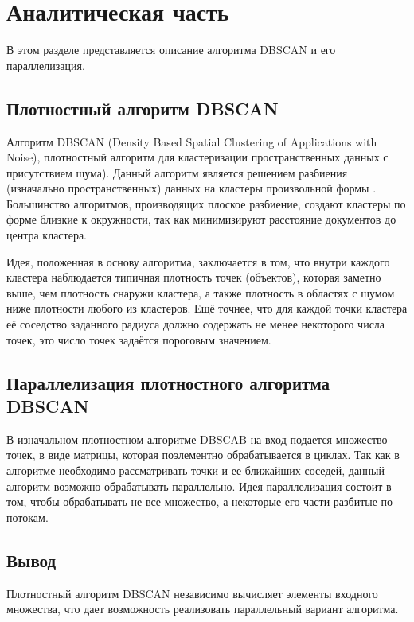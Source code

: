 \chapter{Аналитическая часть}

В этом разделе представляется описание алгоритма DBSCAN и его параллелизация.


\section{Плотностный алгоритм DBSCAN}

Алгоритм DBSCAN \cite{dbscan} (Density Based Spatial Clustering of Applications with Noise),
плотностный алгоритм для кластеризации пространственных данных с присутствием
шума). 
Данный алгоритм является решением разбиения (изначально пространственных) данных на кластеры произвольной формы \cite{cluster}.
Большинство алгоритмов, производящих плоское разбиение, создают кластеры по форме близкие к окружности, так как минимизируют расстояние документов до центра кластера. %

Идея, положенная в основу алгоритма, заключается в том, что внутри каждого кластера наблюдается типичная плотность точек  (объектов), которая заметно выше, чем плотность снаружи кластера, а также плотность в областях с шумом ниже
плотности любого из кластеров. 
Ещё точнее, что для каждой точки кластера её соседство заданного радиуса должно содержать не менее некоторого числа точек, это число точек задаётся пороговым значением.
\section{Параллелизация плотностного алгоритма DBSCAN}

В изначальном плотностном алгоритме DBSCAB на вход подается множество точек, в виде матрицы, которая поэлементно обрабатывается в циклах.
Так как в алгоритме необходимо рассматривать точки и ее ближайших соседей, данный алгоритм возможно обрабатывать параллельно. 
Идея параллелизация состоит в том, чтобы обрабатывать не все множество, а некоторые его части разбитые по потокам.

\section*{Вывод}

Плотностный алгоритм DBSCAN независимо вычисляет элементы входного множества, что дает возможность реализовать параллельный вариант алгоритма.